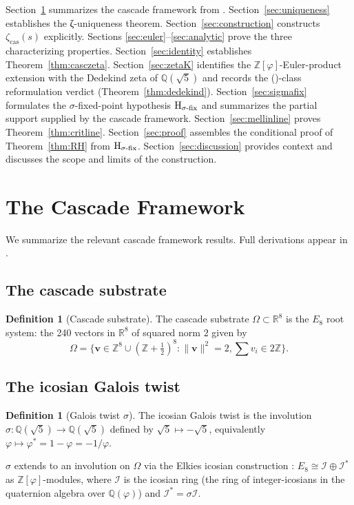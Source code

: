 \documentclass[11pt, a4paper]{amsart}
\theoremstyle{definition}
\newtheorem{definition}[theorem]{Definition}
\newcommand{\R}{\mathbb{R}}
\newcommand{\Z}{\mathbb{Z}}
\newcommand{\Q}{\mathbb{Q}}
\newcommand{\pphi}{\varphi}
\newcommand{\zetacas}{\zeta_{\mathrm{cas}}}
\begin{document}
Section~\ref{sec:cascade} summarizes the cascade framework from
\cite{CascadeFoundations}. Section~\ref{sec:uniqueness} establishes
the ζ-uniqueness theorem. Section~\ref{sec:construction}
constructs $\zetacas(s)$ explicitly. Sections
\ref{sec:euler}--\ref{sec:analytic} prove the three
characterizing properties. Section~\ref{sec:identity}
establishes Theorem~\ref{thm:casczeta}.
Section~\ref{sec:zetaK} identifies the $\Z[\pphi]$-Euler-product
extension with the Dedekind zeta of $\Q(\sqrt{5})$ and records the
(\textdelta)-class reformulation verdict
(Theorem~\ref{thm:dedekind}). Section~\ref{sec:sigmafix}
formulates the $\sigma$-fixed-point hypothesis
$\textup{H}_{\sigma\text{-fix}}$ and summarizes the partial support
supplied by the cascade framework. Section~\ref{sec:mellinline}
proves Theorem~\ref{thm:critline}. Section~\ref{sec:proof}
assembles the conditional proof of Theorem~\ref{thm:RH} from
$\textup{H}_{\sigma\text{-fix}}$. Section~\ref{sec:discussion}
provides context and discusses the scope and limits of the
construction.

\section{The Cascade Framework}\label{sec:cascade}

We summarize the relevant cascade framework results. Full derivations
appear in \cite{CascadeFoundations}.

\subsection{The cascade substrate}

\begin{definition}[Cascade substrate]\label{def:substrate}
The cascade substrate $\Omega \subset \R^8$ is the $E_8$ root system:
the 240 vectors in $\R^8$ of squared norm $2$ given by
\[
\Omega = \{\mathbf{v} \in \Z^8 \cup (\Z + \tfrac{1}{2})^8 : \|\mathbf{v}\|^2 = 2, \textstyle\sum v_i \in 2\Z\}.
\]
\end{definition}

\subsection{The icosian Galois twist}

\begin{definition}[Galois twist $\sigma$]\label{def:sigma}
The icosian Galois twist is the involution $\sigma: \mathbb{Q}(\sqrt 5)
\to \mathbb{Q}(\sqrt 5)$ defined by $\sqrt 5 \mapsto -\sqrt 5$,
equivalently $\pphi \mapsto \pphi^* = 1 - \pphi = -1/\pphi$.

$\sigma$ extends to an involution on $\Omega$ via the Elkies icosian
construction \cite{Elkies}: $E_8 \cong \mathcal{I} \oplus \mathcal{I}^*$
as $\Z[\pphi]$-modules, where $\mathcal{I}$ is the icosian ring (the
ring of integer-icosians in the quaternion algebra over
$\mathbb{Q}(\pphi)$) and $\mathcal{I}^* = \sigma \mathcal{I}$.
\end{definition}
\end{document}
